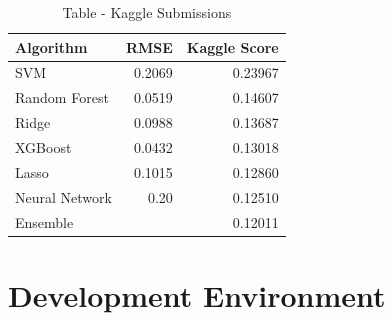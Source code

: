 \documentclass[sigconf]{acmart}
\begin{document}
	\begin{table}[htb]
		\caption{Table - Kaggle Submissions}
		\label{tab:kaggle}		
		\begin{tabular}{lrr}
			\toprule
			Algorithm & RMSE & Kaggle Score \\
			\midrule
		    SVM &  0.2069 & 0.23967 \\
		    Random Forest &  0.0519 & 0.14607 \\
			Ridge &  0.0988 & 0.13687 \\
			XGBoost &  0.0432 & 0.13018 \\					
			Lasso &  0.1015 & 0.12860 \\
			Neural Network &  0.20 & 0.12510 \\
			Ensemble &   & 0.12011 \\
			\bottomrule
		\end{tabular}
	\end{table}

   \section{Development Environment}
    
\end{document}
